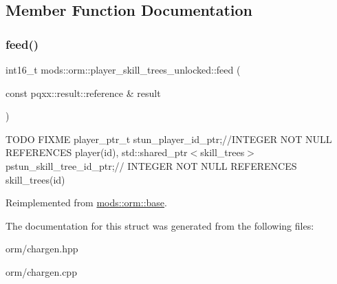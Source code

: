 \subsection{Member Function Documentation}
\mbox{\label{structmods_1_1orm_1_1player__skill__trees__unlocked_a433aeb4a59fe50b22ffe07593cc70aa5}} 
\subsubsection{\texorpdfstring{feed()}{feed()}}
{\footnotesize\ttfamily int16\+\_\+t mods\+::orm\+::player\+\_\+skill\+\_\+trees\+\_\+unlocked\+::feed (\begin{DoxyParamCaption}\item[{const pqxx\+::result\+::reference \&}]{result }\end{DoxyParamCaption})\hspace{0.3cm}{\ttfamily [virtual]}}

T\+O\+DO F\+I\+X\+ME player\+\_\+ptr\+\_\+t stun\+\_\+player\+\_\+id\+\_\+ptr;//\+I\+N\+T\+E\+G\+ER N\+OT N\+U\+LL R\+E\+F\+E\+R\+E\+N\+C\+ES player(id), std\+::shared\+\_\+ptr$<$skill\+\_\+trees$>$ pstun\+\_\+skill\+\_\+tree\+\_\+id\+\_\+ptr;// I\+N\+T\+E\+G\+ER N\+OT N\+U\+LL R\+E\+F\+E\+R\+E\+N\+C\+ES skill\+\_\+trees(id)

Reimplemented from \hyperlink{structmods_1_1orm_1_1base}{mods\+::orm\+::base}.



The documentation for this struct was generated from the following files\+:\begin{DoxyCompactItemize}
\item 
orm/chargen.\+hpp\item 
orm/chargen.\+cpp\end{DoxyCompactItemize}
